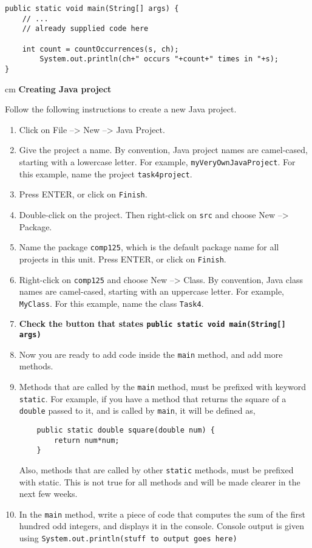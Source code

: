 \begin{questions}
\begin{solution}
\begin{lstlisting}
public static void main(String[] args) {
	// ...
	// already supplied code here
	
	int count = countOccurrences(s, ch);
		System.out.println(ch+" occurs "+count+" times in "+s);
}
\end{lstlisting}
\end{solution}

 cm \question \textbf{Creating Java project} \vskip 0.5cm

Follow the following instructions to create a new Java project.

\begin{enumerate}
\item Click on File --> New --> Java Project.
\item Give the project a name. By convention, Java project names are camel-cased, starting with a lowercase letter. For example, \texttt{myVeryOwnJavaProject}. For this example, name the project \texttt{task4project}.
\item Press ENTER, or click on \texttt{Finish}.
\item Double-click on the project. Then right-click on \texttt{src} and choose New --> Package.
\item Name the package \texttt{comp125}, which is the default package name for all projects in this unit. Press ENTER, or click on \texttt{Finish}.
\item Right-click on \texttt{comp125} and choose New --> Class. By convention, Java class names are camel-cased, starting with an uppercase letter. For example, \texttt{MyClass}. For this example, name the class \texttt{Task4}.
\item \color{red} \textbf{Check the button that states \texttt{public static void main(String[] args)}} \color{black}
\item Now you are ready to add code inside the \texttt{main} method, and add more methods.
\item Methods that are called by the \texttt{main} method, must be prefixed with keyword \texttt{static}. For example, if you have a method that returns the square of a \texttt{double} passed to it, and is called by \texttt{main}, it will be defined as,

\begin{lstlisting}
	public static double square(double num) {
		return num*num;
	}
\end{lstlisting}


Also, methods that are called by other \texttt{static} methods, must be prefixed with static. This is not true for all methods and will be made clearer in the next few weeks.
\item In the \texttt{main} method, write a piece of code that computes the sum of the first hundred odd integers, and displays it in the console. Console output is given using \newline \texttt{System.out.println(stuff to output goes here)}
\end{enumerate}


\end{questions}
